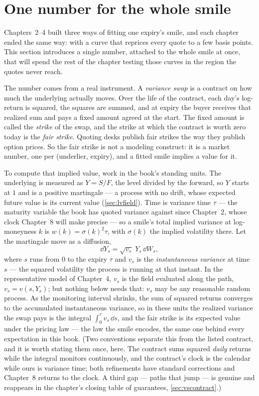\section{One number for the whole smile}
\label{sec:vsnumber}

Chapters~2--4 built three ways of fitting one expiry's smile, and each
chapter ended the same way: with a curve that reprices every quote to a
few basis points.  This section introduces a single number, attached to
the whole smile at once, that will spend the rest of the chapter
testing those curves in the region the quotes never reach.

The number comes from a real instrument.  A \emph{variance swap} is a
contract on how much the underlying actually moves.  Over the life of
the contract, each day's log-return is squared, the squares are summed,
and at expiry the buyer receives that realized sum and pays a fixed
amount agreed at the start.  The fixed amount is called the
\emph{strike} of the swap, and the strike at which the contract is
worth zero today is the \emph{fair strike}.  Quoting desks publish fair
strikes the way they publish option prices.  So the fair strike is not
a modeling construct: it is a market number, one per (underlier,
expiry), and a fitted smile implies a value for it.

To compute that implied value, work in the book's standing units.  The
underlying is measured as $Y=S/F$, the level divided by the forward, so
$Y$ starts at $1$ and is a positive martingale --- a process with no
drift, whose expected future value is its current value
(\cref{sec:lvfield}).  Time is variance time $\tau$ --- the maturity
variable the book has quoted variance against since Chapter~2, whose
clock Chapter~8 will make precise --- so a smile's total implied
variance at log-moneyness $k$ is $w(k)=\sigma(k)^2\tau$, with
$\sigma(k)$ the implied volatility there.  Let the martingale move as
a diffusion,
\[
\dd Y_s=\sqrt{v_s}\;Y_s\,\dd W_s,
\]
where $s$ runs from $0$ to the expiry $\tau$ and $v_s$ is the
\emph{instantaneous variance} at time $s$ --- the squared volatility
the process is running at that instant.  In the representative model of
Chapter~4, $v_s$ is the field evaluated along the path,
$v_s=v(s,Y_s)$; but nothing below needs that: $v_s$ may be any
reasonable random process.  As the monitoring interval shrinks, the
sum of squared returns converges to the accumulated instantaneous
variance, so in these units the realized variance the swap pays is
the integral $\int_0^{\tau}v_s\,\dd s$, and the fair strike is its
expected value under the pricing law --- the law the smile encodes,
the same one behind every expectation in this book.  (Two conventions
separate this from the listed contract, and it is worth stating them
once, here.  The contract sums squared \emph{daily} returns while the
integral monitors continuously, and the contract's clock is the
calendar while ours is variance time; both refinements have standard
corrections and Chapter~8 returns to the clock.  A third gap ---
paths that jump --- is genuine and reappears in the chapter's closing
table of guarantees, \cref{sec:vscontract}.)

